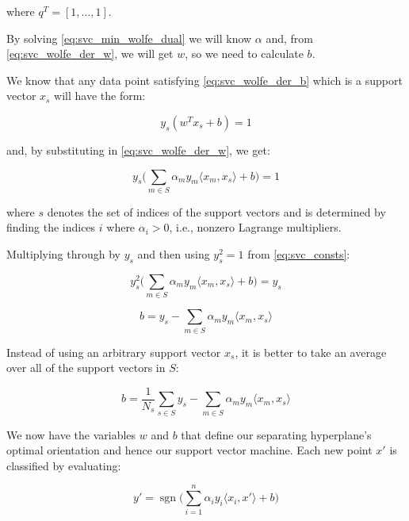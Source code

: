 where $q^T = [1, \dots, 1]$.

By solving \ref{eq:svc_min_wolfe_dual} we will know $\alpha$ and, from \ref{eq:svc_wolfe_der_w}, we will get $w$, so we need to calculate $b.$

We know that any data point satisfying \ref{eq:svc_wolfe_der_b} which is a support vector $x_s$ will have the form:

\begin{equation} \label{eq:svc_sv_const1}
	y_s(w^T x_s + b)=1
\end{equation}

and, by substituting in \ref{eq:svc_wolfe_der_w}, we get:

\begin{equation} \label{eq:svc_sv_const2}
	y_s\big(\sum_{m\in S}\alpha_m y_m \langle x_m, x_s \rangle +b\big)=1
\end{equation}

where $s$ denotes the set of indices of the support vectors and is determined by finding the indices $i$ where $\alpha_i>0$, i.e., nonzero Lagrange multipliers.

Multiplying through by $y_s$ and then using $y_s^2=1$ from \ref{eq:svc_consts}:

\begin{equation} \label{eq:svc_sv_sq_const2}
	y_s^2\big(\sum_{m\in S}\alpha_m y_m \langle x_m, x_s \rangle +b\big)=y_s
\end{equation}

\begin{equation} \label{eq:svc_b}
	b=y_s-\sum_{m\in S}\alpha_m y_m \langle x_m, x_s \rangle
\end{equation}

Instead of using an arbitrary support vector $x_s$, it is better to take an average over all of the support vectors in $S$:

\begin{equation} \label{eq:svc_b_avg}
	b=\frac{1}{N_s}\sum_{s\in S} y_s-\sum_{m\in S}\alpha_m y_m \langle x_m, x_s \rangle
\end{equation}

We now have the variables $w$ and $b$ that define our separating hyperplane's optimal orientation and hence our support vector machine. Each new point $x'$ is classified by evaluating:

\begin{equation} \label{eq:svc_pred}
    y'=\operatorname{sgn}\big(\sum_{i=1}^{n}\alpha_i y_i\langle x_i, x' \rangle+b\big)
\end{equation}

